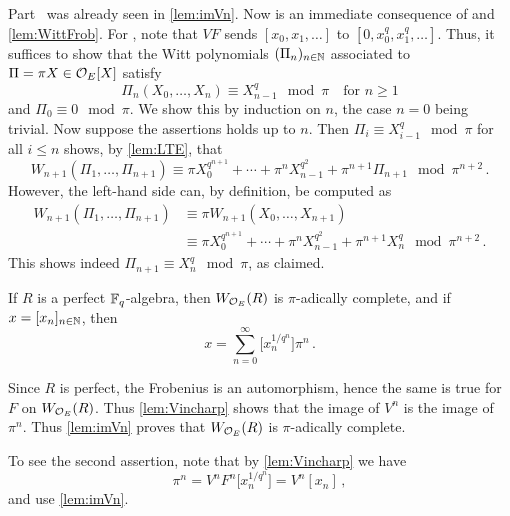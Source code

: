 \begin{proof*}
	Part~ was already seen in \cref{lem:imVn}. Now  is an immediate consequence of  and \cref{lem:WittFrob}. For , note that $VF$ sends $[x_0,x_1,\dotsc]$ to $[0,x_0^q,x_1^q,\dotsc]$. Thus, it suffices to show that the Witt polynomials $(\Pi_n)_{n\in\mathbb{N}}$ associated to $\Pi=\pi X\in\mathcal{O}_E[X]$ satisfy
	\begin{equation*}
		\Pi_n(X_0,\dotsc,X_n)\equiv X_{n-1}^q\mod \pi\quad\text{for }n\geq 1
	\end{equation*}
	and $\Pi_0\equiv 0\mod \pi$. We show this by induction on $n$, the case $n=0$ being trivial. Now suppose the assertions holds up to $n$. Then $\Pi_i\equiv X_{i-1}^q\mod \pi$ for all $i\leq n$ shows, by \cref{lem:LTE}, that
	\begin{equation*}
		W_{n+1}(\Pi_1,\dotsc,\Pi_{n+1})\equiv \pi X_0^{q^{n+1}}+\dotsb+\pi^{n}X_{n-1}^{q^2}+\pi^{n+1}\Pi_{n+1}\mod \pi^{n+2}\,.
	\end{equation*}
	However, the left-hand side can, by definition, be computed as
	\begin{align*}
		W_{n+1}(\Pi_1,\dotsc,\Pi_{n+1})&\equiv\pi W_{n+1}(X_0,\dotsc,X_{n+1})\\
		&\equiv \pi X_0^{q^{n+1}}+\dotsb+\pi^nX_{n-1}^{q^2}+\pi^{n+1}X_n^q\mod \pi^{n+2}\,.
	\end{align*}
	This shows indeed $\Pi_{n+1}\equiv X_n^q\mod \pi$, as claimed.
\end{proof*}
\begin{lem}\label{lem:W_OEpi}
	If $R$ is a perfect $\mathbb{F}_q$-algebra, then $W_{\mathcal{O}_E}(R)$ is $\pi$-adically complete, and if $x=[x_n]_{n\in\mathbb{N}}$, then
	\begin{equation*}
		x=\sum_{n=0}^\infty\big[x_n^{1/q^n}\big]\pi^n\,.
	\end{equation*}
\end{lem}
\begin{proof*}
	Since $R$ is perfect, the Frobenius is an automorphism, hence the same is true for $F$ on $W_{\mathcal{O}_E}(R)$. Thus \cref{lem:Vincharp} shows that the image of $V^n$ is the image of $\pi^n$. Thus \cref{lem:imVn} proves that $W_{\mathcal{O}_E}(R)$ is $\pi$-adically complete.
	
	To see the second assertion, note that by \cref{lem:Vincharp} we have
	\begin{equation*}
		[x_n]\pi^n=V^nF^n\big[x_n^{1/q^n}\big]=V^n[x_n]\,,
	\end{equation*}
	and use \cref{lem:imVn}.
\end{proof*}
